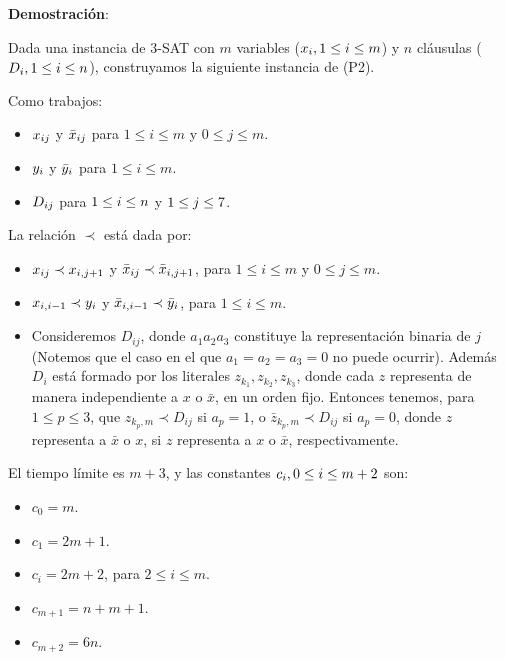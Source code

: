 \documentclass[14pt]{extarticle}
\begin{document}
\textbf{Demostración}:

Dada una instancia de 3-SAT con $m$ variables ($x_i, \space 1 \leq i \leq m$) y $n$ cláusulas ($D_i, \space 1 \leq i \leq n$), construyamos la siguiente instancia de (P2).

Como trabajos:

\begin{itemize}
    \item $x_{ij} \space$ y $\space \bar x_{ij}$ para $1 \leq i \leq m$ y $0 \leq j \leq m$.
    \item $y_{i} \space$ y $\space \bar y_{i}$ para $1 \leq i \leq m$.
    \item $D_{ij} \space$ para $\space 1 \leq i \leq n \space$ y $\space 1 \leq j \leq 7$.
\end{itemize}

La relación $\prec$ está dada por:

\begin{itemize}
    \item $x_{ij} \prec x_{i, j+1} \space$ y $\space \bar x_{ij} \prec \bar x_{i, j+1}$, para $1 \leq i \leq m$ y $0 \leq j \leq m$.
    \item $x_{i, i-1} \prec y_{i} \space$ y $\space \bar x_{i, i-1} \prec \bar y_{i}$, para $1 \leq i \leq m$.
    \item Consideremos $D_{ij}$, donde $a_1a_2a_3$ constituye la representación binaria de $j$ (Notemos que el caso en el que $a_1 = a_2 = a_3 = 0$ no puede ocurrir). Además $D_i$ está formado por los literales $z_{k_1}, z_{k_2}, z_{k_3}$, donde cada $z$ representa de manera independiente a $x$ o $\bar x$, en un orden fijo. Entonces tenemos, para $1 \leq p \leq 3$, que $z_{k_p, m} \prec D_{ij}$ si $a_p = 1$, o $\bar z_{k_p, m} \prec D_{ij}$ si $a_p = 0$, donde $z$ representa a $\bar x$ o $x$, si $z$ representa a $x$ o $\bar x$, respectivamente.
\end{itemize}

El tiempo límite es $m + 3$, y las constantes $c_i, \space 0 \leq i \leq m + 2$ son:

\begin{itemize}
    \item $c_0 = m$.
    \item $c_1 = 2m + 1$.
    \item $c_i = 2m + 2$, para $2 \leq i \leq m$.
    \item $c_{m+1} = n + m + 1$.
    \item $c_{m+2} = 6n$.
\end{itemize}
\end{document}

